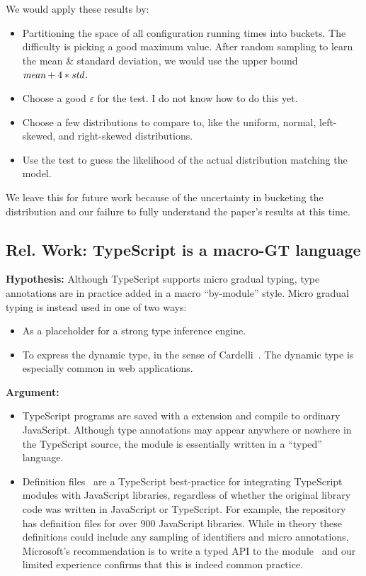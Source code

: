 \documentclass{article}
\begin{document}
We would apply these results by:
\begin{itemize}
\item
  Partitioning the space of all configuration running times into buckets.
  The difficulty is picking a good maximum value.
  After random sampling to learn the mean \& standard deviation, we would use the upper bound $\emph{mean} + 4 * \emph{std}$.
\item
  Choose a good $\varepsilon$ for the test.
  I do not know how to do this yet.
\item
  Choose a few distributions to compare to, like the uniform, normal, left-skewed, and right-skewed distributions.
\item
  Use the test to guess the likelihood of the actual distribution matching the model.
\end{itemize}
We leave this for future work because of the uncertainty in bucketing the distribution and our failure to fully understand the paper's results at this time.


\subsection{Rel. Work: TypeScript is a macro-GT language}
\textbf{Hypothesis:}
Although TypeScript supports micro gradual typing, type annotations are in practice added in a macro ``by-module'' style.
Micro gradual typing is instead used in one of two ways:
\begin{itemize}
\item As a placeholder for a strong type inference engine.
\item To express the dynamic type, in the sense of Cardelli~\cite{todo}.
  The dynamic type is especially common in web applications.
\end{itemize}

\textbf{Argument:}
\begin{itemize}
\item
  TypeScript programs are saved with a  extension and compile to ordinary JavaScript.
  Although type annotations may appear anywhere or nowhere in the TypeScript source, the module is essentially written in a ``typed'' language.
\item
  Definition files~\cite{todo} are a TypeScript best-practice for integrating TypeScript modules with JavaScript libraries, regardless of whether the original library code was written in JavaScript or TypeScript.
  For example, the  repository~\cite{todo} has definition files for over 900 JavaScript libraries.
  While in theory these definitions could include any sampling of identifiers and micro annotations, Microsoft's recommendation is to write a typed API to the module~\cite{todo} and our limited experience confirms that this is indeed common practice.
\end{itemize}

\vfill


\end{document}
